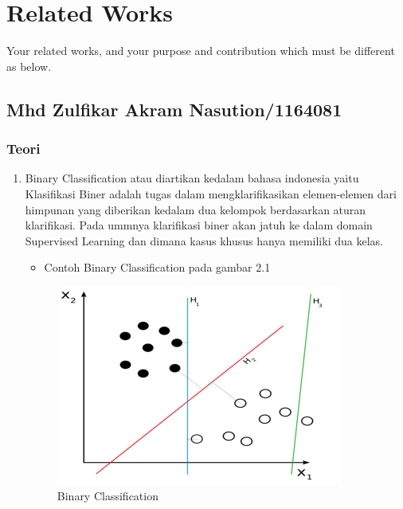 \chapter{Related Works}

Your related works, and your purpose and contribution which must be different as below.

\section{Mhd Zulfikar Akram Nasution/1164081}
\subsection{Teori}
\begin{enumerate}
\item Binary Classification atau diartikan kedalam bahasa indonesia yaitu Klasifikasi Biner adalah tugas dalam mengklarifikasikan elemen-elemen dari himpunan yang diberikan kedalam dua kelompok berdasarkan aturan klarifikasi. Pada ummnya klarifikasi biner akan jatuh ke dalam domain Supervised Learning dan dimana kasus khusus hanya memiliki dua kelas.
\begin{itemize}
\item  Contoh Binary Classification pada gambar 2.1
\end{itemize}
\begin{figure}[ht]
\centering
\includegraphics[scale=0.9]{figures/zulfikar/1.png}
\caption{Binary Classification}
\end{figure}


\end{enumerate}
